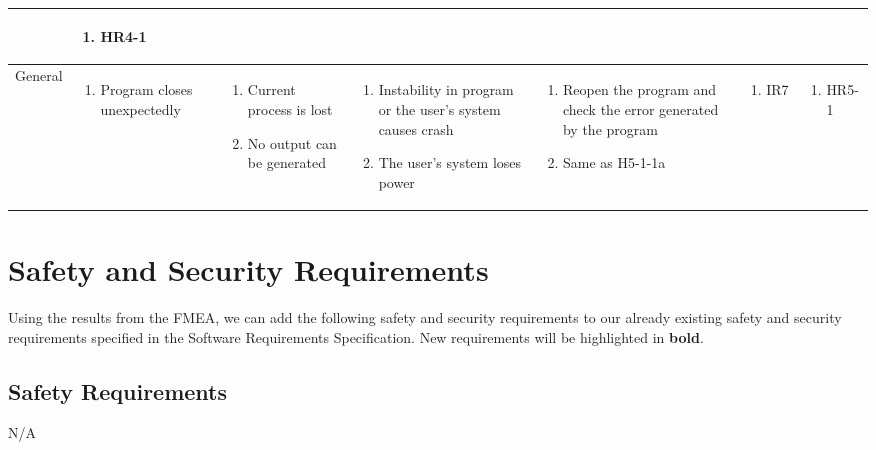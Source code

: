 \documentclass{article}
\begin{document}
\begin{landscape}
\begin{longtable}{|p{4cm}|p{2.5cm}|p{3.5cm}|p{3cm}|p{5.5cm}|p{1.8cm}|p{2cm}|}
\begin{enumerate}[label=1\alph*.]
\end{enumerate}
&
 \begin{enumerate}
     \item HR4-1
 \end{enumerate}\\
\hline
General
& 
\begin{enumerate}
    \item Program closes unexpectedly
\end{enumerate}
& 
\begin{enumerate}[label=1\alph*.]
    \item Current process is lost
    \item No output can be generated
\end{enumerate}
& 
\begin{enumerate}[label=1\alph*.]
    \item Instability in program or the user's system causes crash
    \item The user's system loses power
\end{enumerate}
&
\begin{enumerate}[label=1\alph*.]
    \item Reopen the program and check the error generated by the program
    \item Same as H5-1-1a
\end{enumerate}
&
\begin{enumerate}[label=1\alph*.]
    \item IR7
\end{enumerate}
&
 \begin{enumerate}
     \item HR5-1
 \end{enumerate}\\
\hline
\end{longtable}
\end{landscape}
\restoregeometry
\newpage
\section{Safety and Security Requirements}
Using the results from the FMEA, we can add the following safety and security requirements to our already existing safety and security requirements specified in the Software Requirements Specification. New requirements will be highlighted in \textbf{bold}.
\subsection{Safety Requirements}
N/A
\end{document}
